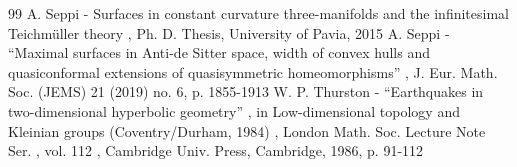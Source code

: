 \begin{thebibliography}{99}
 A. Seppi - Surfaces in constant curvature three-manifolds and the infinitesimal Teichmüller theory , Ph. D. Thesis, University of Pavia, 2015
 A. Seppi - “Maximal surfaces in Anti-de Sitter space, width of convex hulls and quasiconformal extensions of quasisymmetric homeomorphisms” , J. Eur. Math. Soc. (JEMS) 21 (2019) no. 6, p. 1855-1913
 W. P. Thurston - “Earthquakes in two-dimensional hyperbolic geometry” , in Low-dimensional topology and Kleinian groups (Coventry/Durham, 1984) , London Math. Soc. Lecture Note Ser. , vol. 112 , Cambridge Univ. Press, Cambridge, 1986, p. 91-112
\end{thebibliography}
